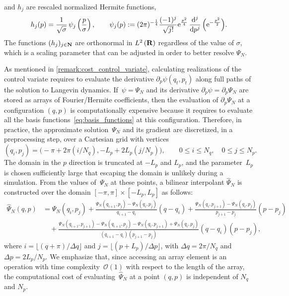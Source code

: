 \documentclass[11pt,a4paper]{article}
\begin{document}
and $h_j$ are rescaled normalized Hermite functions,
\begin{equation}
  \label{eq:definition_hermite_functions}
  h_j(p) = \frac{1}{\sqrt{\sigma}} \, \psi_j \left( \frac{p}{\sigma} \right),
  \qquad \psi_j (p) := (2 \pi)^{-\frac{1}{4}} \frac{(-1)^j}{\sqrt{j!}} \e^{\frac{p^2}{4}} \, \derivative*{j}{p^j} \, \Bigl( \e^{- \frac{p^2}{2}} \Bigr).
\end{equation}
The functions $(h_j)_{j\in \mathbf N}$ are orthonormal in $\lp{2}{\real}$ regardless of the value of $\sigma$,
which is a scaling parameter that can be adjusted in order to better resolve $\Psi_N$.

As mentioned in \cref{remark:cost_control_variate},
calculating realizations of the control variate requires to evaluate the derivative $\partial_p \psi(q_t, p_t)$ along full paths of the solution to Langevin dynamics.
If~$\psi = \Psi_N$ and its derivative $\partial_p \psi = \partial_p \Psi_N$ are stored as arrays of Fourier/Hermite coefficients,
then the evaluation of $\partial_p \Psi_N$ at a configuration $(q, p)$ is computationally expensive
because it requires to evaluate all the basis functions~\eqref{eq:basis_functions} at this configuration.
Therefore, in practice, the approximate solution~$\Psi_N$ and its gradient are discretized, in a preprocessing step,
over a Cartesian grid with vertices
\[
    (q_i, p_j) = \bigl(- \pi + 2\pi(i/N_q) , - L_p + 2L_p (j/N_p) \bigr), \qquad 0 \leq i \leq N_q, \quad 0 \leq j \leq N_p.
\]
The domain in the $p$ direction is truncated at $-L_p$ and $L_p$,
and the parameter~$L_p$ is chosen sufficiently large that escaping the domain is unlikely during a simulation.
From the values of~$\Psi_N$ at these points,
a bilinear interpolant $\widehat \Psi_N$ is constructed over the domain $[-\pi, \pi] \times [-L_p, L_p]$ as follows:
\begin{align*}
    \widehat \Psi_N(q, p)
    &= \Psi_N(q_i,p_j) + \frac{\Psi_N(q_{i+1}, p_j) - \Psi_N(q_i, p_j)}{q_{i+1} - q_i} (q - q_i)
    +\frac{\Psi_N(q_{i}, p_{j+1}) - \Psi_N(q_{i}, p_{j})}{p_{j+1} - p_j} (p - p_j) \\
    &\quad + \frac{\Psi_N(q_{i+1}, p_{j+1}) - \Psi_N(q_{i+1}, p_{j}) - \Psi_N(q_{i}, p_{j+1}) + \Psi_N(q_{i}, p_{j})}{(q_{i+1} - q_i)(p_{j+1} - p_j)}  (q-q_i)(p-p_j),
\end{align*}
where $i = \lfloor (q + \pi) / \Delta q \rfloor$ and $j = \lfloor (p+L_p) / \Delta p \rfloor$,
with $\Delta q = 2\pi/N_q$ and $\Delta p = 2L_p/N_p$.
We emphasize that,
since accessing an array element is an operation with time complexity~$\mathcal O(1)$ with respect to the length of the array,
the computational cost of evaluating~$\widehat \Psi_N$ at a point $(q,p)$ is independent of $N_q$ and $N_p$.
\end{document}
